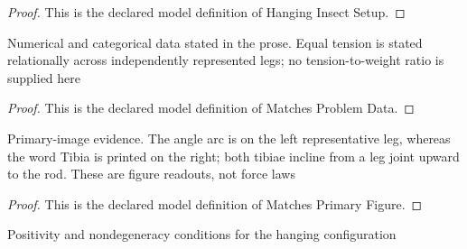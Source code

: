 \begin{proof}
  This is the declared model definition of Hanging Insect Setup.
\end{proof}
\begin{definition}
  \label{def:physics:phyx-mini-0758:phyxminiproblems-problemphyxmini0758-matchesproblemdata}
  Numerical and categorical data stated in the prose. Equal tension is stated relationally across independently represented legs; no tension-to-weight ratio is supplied here
\end{definition}
\begin{proof}
  This is the declared model definition of Matches Problem Data.
\end{proof}
\begin{definition}
  \label{def:physics:phyx-mini-0758:phyxminiproblems-problemphyxmini0758-matchesprimaryfigure}
  Primary-image evidence. The angle arc is on the left representative leg, whereas the word Tibia is printed on the right; both tibiae incline from a leg joint upward to the rod. These are figure readouts, not force laws
\end{definition}
\begin{proof}
  This is the declared model definition of Matches Primary Figure.
\end{proof}
\begin{definition}
  \label{def:physics:phyx-mini-0758:phyxminiproblems-problemphyxmini0758-hasphysicalhangingparameters}
  Positivity and nondegeneracy conditions for the hanging configuration
\end{definition}
